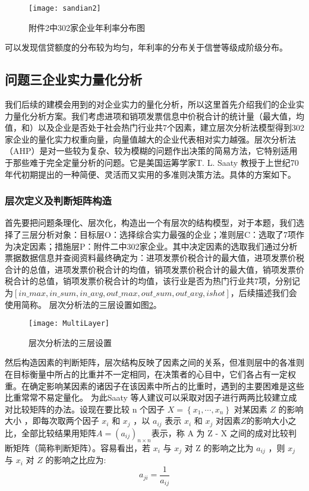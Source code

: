 \documentclass{cumcmthesis}
\begin{document}
    \begin{figure}[H]
        \centering
        \texttt{[image: sandian2]}
        \caption{附件2中302家企业年利率分布图}
        \label{sandian2}
    \end{figure}
    可以发现信贷额度的分布较为均匀，年利率的分布关于信誉等级成阶级分布。

\subsection{问题三企业实力量化分析}
我们后续的建模会用到的对企业实力的量化分析，所以这里首先介绍我们的企业实力量化分析方案。我们考虑进项和销项发票信息中价税合计的统计量（最大值，均值，和）以及企业是否处于社会热门行业共7个因素，建立层次分析法模型得到302家企业的量化实力权重向量，向量值越大的企业代表相对实力越强。层次分析法（AHP）是对一些较为复杂、较为模糊的问题作出决策的简易方法，它特别适用于那些难于完全定量分析的问题。它是美国运筹学家T. L. Saaty 教授于上世纪70 年代初期提出的一种简便、灵活而又实用的多准则决策方法。具体的方案如下。



\subsubsection{层次定义及判断矩阵构造}
首先要把问题条理化、层次化，构造出一个有层次的结构模型，对于本题，我们选择了三层分析对象：目标层O：选择综合实力最强的企业；准则层C：选取了7项作为决定因素；措施层P：附件二中302家企业。其中决定因素的选取我们通过分析票据数据信息并查阅资料最终确定为：进项发票价税合计的最大值，进项发票价税合计的总值，进项发票价税合计的均值，销项发票价税合计的最大值，销项发票价税合计的总值，销项发票价税合计的均值，该行业是否为热门行业共7项，分别记为$\left[ in\_max,in\_sum,in\_avg,out\_max,out\_sum,out\_avg,ishot \right] $，后续描述我们会使用简称。
层次分析法的三层设置如图\ref{MultiLayer}。
\begin{figure}[H]
    \centering
    \texttt{[image: MultiLayer]}
    \caption{层次分析法的三层设置}
    \label{MultiLayer}
\end{figure}

然后构造因素的判断矩阵，层次结构反映了因素之间的关系，但准则层中的各准则在目标衡量中所占的比重并不一定相同，在决策者的心目中，它们各占有一定权重。在确定影响某因素的诸因子在该因素中所占的比重时，遇到的主要困难是这些比重常常不易定量化。 为此Saaty 等人建议可以采取对因子进行两两比较建立成对比较矩阵的办法。设现在要比较 n 个因子 $X = \left\{ x_1,\cdots, x_n \right\} $ 对某因素 $Z$ 的影响大小 ，即每次取两个因子 $x_i$ 和 $x_j$ ，以 $a_{ij}$ 表示 $x_i$ 和 $x_j$ 对因素$Z$的影响大小之比，全部比较结果用矩阵$A = (a_{ij} )_{n \times n} $表示，称 A 为 Z - X 之间的成对比较判断矩阵（简称判断矩阵）。容易看出，若 $x_i$ 与 $x_j$ 对 Z 的影响之比为 $a_{ij}$ ，则 $x_j$ 与 $x_i$ 对 $Z$ 的影响之比应为:
\begin{equation}
    a_{ji} = \frac{1}{a_{ij}}
\end{equation}
\end{document}
